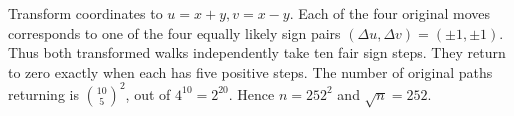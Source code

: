 Transform coordinates to $u=x+y,v=x-y$. Each of the four original moves corresponds to one of the four equally likely sign pairs $(\Delta u,\Delta v)=(\pm1,\pm1)$. Thus both transformed walks independently take ten fair sign steps. They return to zero exactly when each has five positive steps. The number of original paths returning is $\binom{10}{5}^2$, out of $4^{10}=2^{20}$. Hence $n=252^2$ and $\boxed{\sqrt n=252}$.
